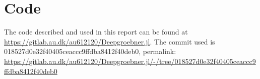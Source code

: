 \documentclass{article}
\theoremstyle{changedot}
\theoremstyle{changedotbreak}
\theoremstyle{nonumberplain}
\begin{document}
\printbibliography

\appendix
\section{Code}
The code described and used in this report can be found at \url{https://gitlab.au.dk/au612120/Deepgroebner.jl}. The commit used is 018527d0e32f40405ceaccc9ffdba8412f40deb0, permalink: \url{https://gitlab.au.dk/au612120/Deepgroebner.jl/-/tree/018527d0e32f40405ceaccc9ffdba8412f40deb0}
\end{document}
